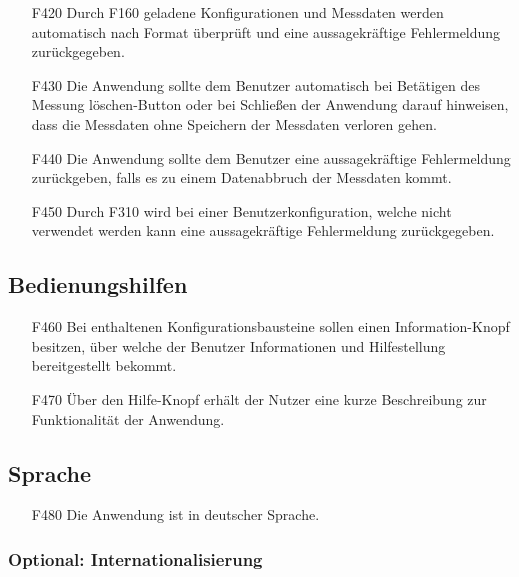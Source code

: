 \documentclass[parskip=full]{scrartcl}
\begin{document}
\begin{itemize}
\item[F420] Durch F160 geladene Konfigurationen und Messdaten werden automatisch nach Format überprüft und eine aussagekräftige Fehlermeldung zurückgegeben.
\item[F430] Die Anwendung sollte dem Benutzer automatisch bei Betätigen des Messung löschen-Button oder bei Schließen der Anwendung darauf hinweisen, dass die Messdaten ohne Speichern der Messdaten verloren gehen.
\item[F440] Die Anwendung sollte dem Benutzer eine aussagekräftige Fehlermeldung zurückgeben, falls es zu einem Datenabbruch der Messdaten kommt.
\item[F450] Durch F310 wird bei einer Benutzerkonfiguration, welche nicht verwendet werden kann eine aussagekräftige Fehlermeldung zurückgegeben.

\end{itemize}



\subsection{Bedienungshilfen}

\begin{itemize}

\item[F460] Bei enthaltenen Konfigurationsbausteine sollen einen Information-Knopf besitzen, über welche der Benutzer Informationen und Hilfestellung bereitgestellt bekommt.
\item[F470] Über den Hilfe-Knopf erhält der Nutzer eine kurze Beschreibung zur Funktionalität der Anwendung.

\end{itemize}

\subsection{Sprache}

\begin{itemize}

\item[F480] Die Anwendung ist in deutscher Sprache.

\end{itemize}

\subsubsection{Optional: Internationalisierung}
\end{document}

